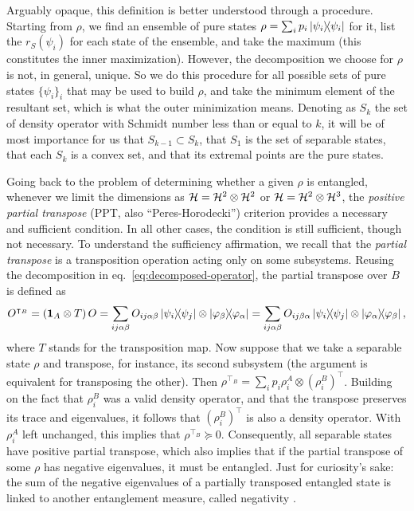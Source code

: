 		Arguably opaque, this definition is better understood through a procedure. Starting from $\rho$, we find an ensemble of pure states $\rho = \sum_i p_i \ketbra{\psi_i}{\psi_i}$ for it, list the $r_S(\psi_i)$ for each state of the ensemble, and take the maximum (this constitutes the inner maximization). However,  the decomposition we choose for $\rho$ is not, in general, unique. So we do this procedure for all possible sets of pure states $\{ \psi_i \}_i$ that may be used to build $\rho$, and take the minimum element of the resultant set, which is what the outer minimization means. Denoting as $S_k$ the set of density operator with Schmidt number less than or equal to $k$, it will be of most importance for us that $S_{k-1} \subset S_k$, that $S_1$ is the set of separable states, that each $S_k$ is a convex set, and that its extremal points are the pure states.
	
		Going back to the problem of determining whether a given $\rho$ is entangled, whenever we limit the dimensions as $\mathcal{H} = \mathcal{H}^{2} \otimes \mathcal{H}^{2}$ or $\mathcal{H} = \mathcal{H}^{2} \otimes \mathcal{H}^{3}$, the \emph{positive partial transpose} (PPT, also ``Peres-Horodecki'') criterion provides a necessary and sufficient condition. In all other cases, the condition is still sufficient, though not necessary. To understand the sufficiency affirmation, we recall that the \emph{partial transpose} is a transposition operation acting only on some subsystems. Reusing the decomposition in eq.~\eqref{eq:decomposed-operator}, the partial transpose over $B$ is defined as
		$$
			O^{\intercal_B} = (\mathbf{1}_A \otimes T)\,O = \sum_{ij\alpha\beta} O_{ij\alpha\beta} \ketbra{\psi_i}{\psi_j} \otimes \ketbra{\varphi_\beta}{\varphi_\alpha} = \sum_{ij\alpha\beta} O_{ij\beta\alpha} \ketbra{\psi_i}{\psi_j} \otimes \ketbra{\varphi_\alpha}{\varphi_\beta} , 
		$$
		where $T$ stands for the transposition map. Now suppose that we take a separable state $\rho$ and transpose, for instance, its second subsystem (the argument is equivalent for transposing the other). Then $\rho^{\intercal_B} = \sum_i p_i \rho_i^A \otimes \left( \rho_i^B \right)^\intercal$. Building on the fact that $\rho_i^B$ was a valid density operator, and that the transpose preserves its trace and eigenvalues, it follows that $\left( \rho_i^B \right)^\intercal$ is also a density operator. With $\rho_i^A$ left unchanged, this implies that $\rho^{\intercal_B} \succeq 0$. Consequently, all separable states have positive partial transpose, which also implies that if the partial transpose of some $\rho$ has negative eigenvalues, it must be entangled. Just for curiosity's sake: the sum of the negative eigenvalues of a partially transposed entangled state is linked to another entanglement measure, called negativity \cite{horodecki_2009_entanglement}.
	
